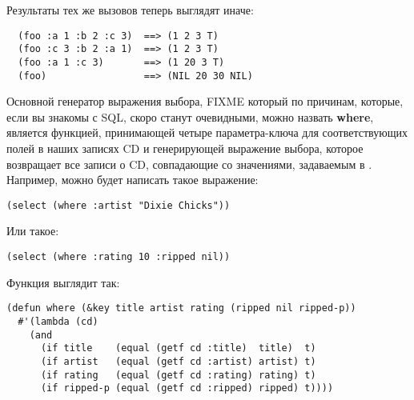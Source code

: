 Результаты тех же вызовов теперь выглядят иначе:

\begin{verbatim}
  (foo :a 1 :b 2 :c 3)  ==> (1 2 3 T)
  (foo :c 3 :b 2 :a 1)  ==> (1 2 3 T)
  (foo :a 1 :c 3)       ==> (1 20 3 T)
  (foo)                 ==> (NIL 20 30 NIL)
\end{verbatim}

Основной генератор выражения выбора, FIXME который по причинам, которые, если вы знакомы с
SQL, скоро станут очевидными, можно назвать \textbf{where}, является функцией, принимающей
четыре параметра-ключа для соответствующих полей в наших записях CD и генерирующей
выражение выбора, которое возвращает все записи о CD, совпадающие со значениями,
задаваемым в . Например, можно будет написать такое выражение:

\begin{lstlisting}
(select (where :artist "Dixie Chicks"))
\end{lstlisting}

Или такое:

\begin{lstlisting}
(select (where :rating 10 :ripped nil))
\end{lstlisting}

Функция выглядит так:

\begin{lstlisting}
(defun where (&key title artist rating (ripped nil ripped-p))
  #'(lambda (cd)
    (and
      (if title    (equal (getf cd :title)  title)  t)
      (if artist   (equal (getf cd :artist) artist) t)
      (if rating   (equal (getf cd :rating) rating) t)
      (if ripped-p (equal (getf cd :ripped) ripped) t))))
\end{lstlisting}

